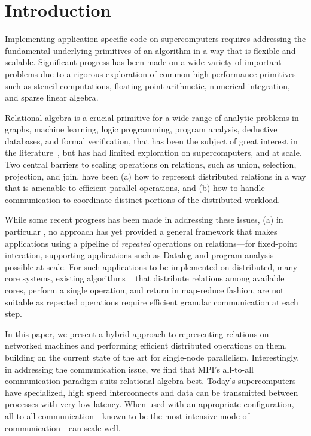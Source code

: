 

\section{Introduction}
\label{sec:intro}
%
Implementing application-specific code on supercomputers requires addressing the fundamental underlying primitives of an algorithm in a way that is flexible and scalable. Significant progress has been made on a wide variety of important problems due to a rigorous exploration of common high-performance primitives such as stencil computations, floating-point arithmetic, numerical integration, and sparse linear algebra. 

Relational algebra is a crucial primitive for a wide range of analytic problems in graphs, machine learning, logic programming, program analysis, deductive databases, and formal verification, that has been the subject of great interest in the literature~\cite{Whaley:2004:CCP:996893.996859,Smaragdakis:2010:UDF:2185923.2185939,Scholz:2016:FLP:2892208.2892226,10.1007/978-3-319-41540-6_23,zhang2014abstraction}, but has had limited exploration on supercomputers, and at scale. Two central barriers to scaling operations on relations, such as union, selection, projection, and join, have been (a) how to represent distributed relations in a way that is amenable to efficient parallel operations, and (b) how to handle communication to coordinate distinct portions of the distributed workload.

While some recent progress has been made in addressing these issues, (a) in particular \cite{Valduriez:1988:PET:54616.54618,Cheiney:1990:PST:94362.94445}, no approach has yet provided a general framework that makes applications using a pipeline of \emph{repeated} operations on relations---for fixed-point interation, supporting applications such as Datalog and program analysis---possible at scale. For such applications to be implemented on distributed, many-core systems, existing algorithms ~\cite{Barthels:2017:DJA:3055540.3055545} that distribute relations among available cores, perform a single operation, and return in map-reduce fashion, are not suitable as repeated operations require efficient granular communication at each step. 

In this paper, we present a hybrid approach to representing relations on networked machines and performing efficient distributed operations on them, building on the current state of the art for single-node parallelism. Interestingly, in addressing the communication issue, we find that MPI's all-to-all communication paradigm suits relational algebra best. Today's supercomputers have specialized, high speed interconnects and data can be transmitted between processes with very low latency. When used with an appropriate configuration, all-to-all communication---known to be the most intensive mode of communication---can scale well.



